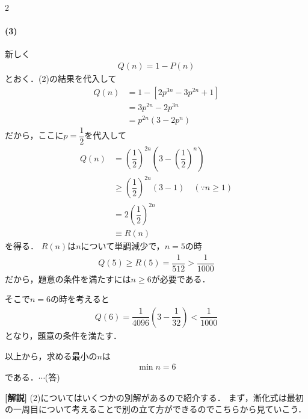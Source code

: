 \documentclass[../../main.tex]{subfiles}
\begin{document}
\begin{multicols}{2}
  \paragraph{(3)}
  新しく
  \begin{align}
    Q(n) = 1-P(n)
  \end{align}
  とおく．(2)の結果を代入して
  \begin{align}
    Q(n)
    & = 1 - \left[2p^{3n}-3p^{2n}+1\right] \\
    & = 3p^{2n} - 2p^{3n}                  \\
    & = p^{2n}(3-2p^n)
  \end{align}
  だから，ここに$p=\dfrac{1}{2}$を代入して
  \begin{align}
    Q(n)
    & = \left(\dfrac{1}{2}\right)^{2n}\left(3-\left(\dfrac{1}{2}\right)^n\right)    \\
    & \ge \left(\dfrac{1}{2}\right)^{2n}\left(3-1\right)  \quad (\because n \ge 1) \\
    & = 2\left(\dfrac{1}{2}\right)^{2n}                                            \\
    & \equiv R(n)
  \end{align}
  を得る．
  $R(n)$は$n$について単調減少で，$n=5$の時
  \begin{align}
    Q(5) \ge R(5) = \dfrac{1}{512} > \dfrac{1}{1000}
  \end{align}
  だから，題意の条件を満たすには$n \ge 6$が必要である．

  そこで$n=6$の時を考えると
  \begin{align}
    Q(6) = \dfrac{1}{4096}\left(3-\dfrac{1}{32}\right) < \dfrac{1}{1000}
  \end{align}
  となり，題意の条件を満たす．

  以上から，求める最小の$n$は
  \begin{align}
    \min n = 6
  \end{align}
  である．$\cdots$(答)

  {\bf [解説]}
  (2)についてはいくつかの別解があるので紹介する．
  まず，漸化式は最初の一周目について考えることで別の立て方ができるのでこちらから見ていこう．


\end{multicols}
\end{document}
